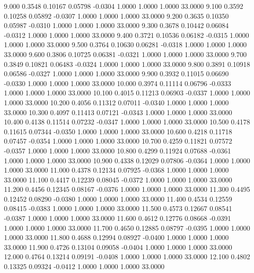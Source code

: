    9.000   0.3548   0.10167   0.05798  -0.0304   1.0000   1.0000   1.0000  33.0000
   9.100   0.3592   0.10258   0.05892  -0.0307   1.0000   1.0000   1.0000  33.0000
   9.200   0.3635   0.10350   0.05987  -0.0310   1.0000   1.0000   1.0000  33.0000
   9.300   0.3678   0.10442   0.06084  -0.0312   1.0000   1.0000   1.0000  33.0000
   9.400   0.3721   0.10536   0.06182  -0.0315   1.0000   1.0000   1.0000  33.0000
   9.500   0.3764   0.10630   0.06281  -0.0318   1.0000   1.0000   1.0000  33.0000
   9.600   0.3806   0.10725   0.06381  -0.0321   1.0000   1.0000   1.0000  33.0000
   9.700   0.3849   0.10821   0.06483  -0.0324   1.0000   1.0000   1.0000  33.0000
   9.800   0.3891   0.10918   0.06586  -0.0327   1.0000   1.0000   1.0000  33.0000
   9.900   0.3932   0.11015   0.06690  -0.0330   1.0000   1.0000   1.0000  33.0000
  10.000   0.3974   0.11114   0.06796  -0.0333   1.0000   1.0000   1.0000  33.0000
  10.100   0.4015   0.11213   0.06903  -0.0337   1.0000   1.0000   1.0000  33.0000
  10.200   0.4056   0.11312   0.07011  -0.0340   1.0000   1.0000   1.0000  33.0000
  10.300   0.4097   0.11413   0.07121  -0.0343   1.0000   1.0000   1.0000  33.0000
  10.400   0.4138   0.11514   0.07232  -0.0347   1.0000   1.0000   1.0000  33.0000
  10.500   0.4178   0.11615   0.07344  -0.0350   1.0000   1.0000   1.0000  33.0000
  10.600   0.4218   0.11718   0.07457  -0.0354   1.0000   1.0000   1.0000  33.0000
  10.700   0.4259   0.11821   0.07572  -0.0357   1.0000   1.0000   1.0000  33.0000
  10.800   0.4299   0.11924   0.07688  -0.0361   1.0000   1.0000   1.0000  33.0000
  10.900   0.4338   0.12029   0.07806  -0.0364   1.0000   1.0000   1.0000  33.0000
  11.000   0.4378   0.12134   0.07925  -0.0368   1.0000   1.0000   1.0000  33.0000
  11.100   0.4417   0.12239   0.08045  -0.0372   1.0000   1.0000   1.0000  33.0000
  11.200   0.4456   0.12345   0.08167  -0.0376   1.0000   1.0000   1.0000  33.0000
  11.300   0.4495   0.12452   0.08290  -0.0380   1.0000   1.0000   1.0000  33.0000
  11.400   0.4534   0.12559   0.08415  -0.0383   1.0000   1.0000   1.0000  33.0000
  11.500   0.4573   0.12667   0.08541  -0.0387   1.0000   1.0000   1.0000  33.0000
  11.600   0.4612   0.12776   0.08668  -0.0391   1.0000   1.0000   1.0000  33.0000
  11.700   0.4650   0.12885   0.08797  -0.0395   1.0000   1.0000   1.0000  33.0000
  11.800   0.4688   0.12994   0.08927  -0.0400   1.0000   1.0000   1.0000  33.0000
  11.900   0.4726   0.13104   0.09058  -0.0404   1.0000   1.0000   1.0000  33.0000
  12.000   0.4764   0.13214   0.09191  -0.0408   1.0000   1.0000   1.0000  33.0000
  12.100   0.4802   0.13325   0.09324  -0.0412   1.0000   1.0000   1.0000  33.0000
